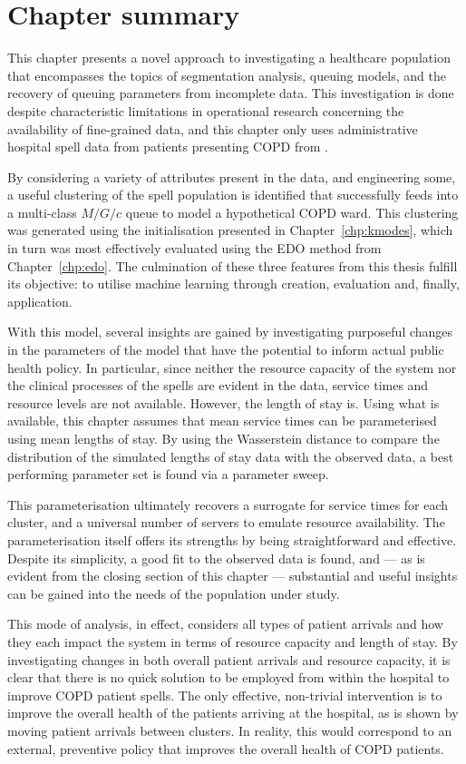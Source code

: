 \section{Chapter summary}\label{sec:copd:summary}

This chapter presents a novel approach to investigating a healthcare population
that encompasses the topics of segmentation analysis, queuing models, and the
recovery of queuing parameters from incomplete data. This investigation is done
despite characteristic limitations in operational research concerning the
availability of fine-grained data, and this chapter only uses administrative
hospital spell data from patients presenting COPD from \ctmuhb.

By considering a variety of attributes present in the data, and engineering
some, a useful clustering of the spell population is identified that
successfully feeds into a multi-class \(M/G/c\) queue to model a hypothetical
COPD ward. This clustering was generated using the initialisation presented in
Chapter~\ref{chp:kmodes}, which in turn was most effectively evaluated using the
EDO method from Chapter~\ref{chp:edo}. The culmination of these three features
from this thesis fulfill its objective: to utilise machine learning through
creation, evaluation and, finally, application.

With this model, several insights are gained by investigating purposeful changes
in the parameters of the model that have the potential to inform actual public
health policy. In particular, since neither the resource capacity of the system
nor the clinical processes of the spells are evident in the data, service times
and resource levels are not available. However, the length of stay is. Using
what is available, this chapter assumes that mean service times can be
parameterised using mean lengths of stay. By using the Wasserstein distance to
compare the distribution of the simulated lengths of stay data with the observed
data, a best performing parameter set is found via a parameter sweep.

This parameterisation ultimately recovers a surrogate for service times for each
cluster, and a universal number of servers to emulate resource availability. The
parameterisation itself offers its strengths by being straightforward and
effective. Despite its simplicity, a good fit to the observed data is found,
and --- as is evident from the closing section of this chapter --- substantial
and useful insights can be gained into the needs of the population under study.

This mode of analysis, in effect, considers all types of patient arrivals and
how they each impact the system in terms of resource capacity and length of
stay. By investigating changes in both overall patient arrivals and resource
capacity, it is clear that there is no quick solution to be employed from within
the hospital to improve COPD patient spells. The only effective, non-trivial
intervention is to improve the overall health of the patients arriving at the
hospital, as is shown by moving patient arrivals between clusters. In reality,
this would correspond to an external, preventive policy that improves the
overall health of COPD patients.
